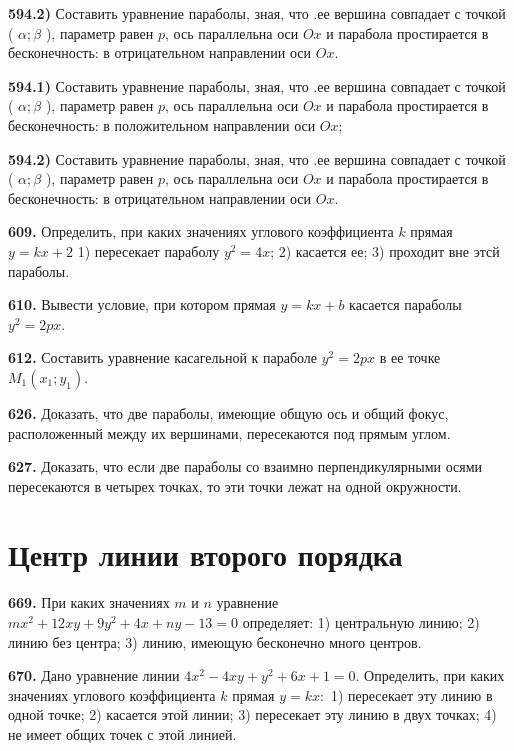 \textbf{594.2)} Составить уравнение параболы, зная, что .ее вершина совпадает с точкой ( $\alpha ; \beta$ ), параметр равен $p$, ось параллельна оси $O x$ и парабола простирается в бесконечность: в отрицательном направлении оси $O x$.

\textbf{594.1)} Составить уравнение параболы, зная, что .ее вершина совпадает с точкой ( $\alpha ; \beta$ ), параметр равен $p$, ось параллельна оси $O x$ и парабола простирается в бесконечность: в положительном направлении оси $O x$;

\textbf{594.2)} Составить уравнение параболы, зная, что .ее вершина совпадает с точкой ( $\alpha ; \beta$ ), параметр равен $p$, ось параллельна оси $O x$ и парабола простирается в бесконечность: в отрицательном направлении оси $O x$.

\textbf{609.} Определить, при каких значениях углового коэффициента $k$ прямая $y=k x+2$ 1) пересекает параболу $y^2=4 x$; 2) касается ее; 3) проходит вне этсй параболы.

\textbf{610.} Вывести условие, при котором прямая $y=k x+b$ касается параболы $y^2=2 p x$.

\textbf{612.} Составить уравнение касагельной к параболе $y^2=2 p x$ в ее точке $M_1\left(x_1 ; y_1\right)$.

\textbf{626.} Доказать, что две параболы, имеющие общую ось и общий фокус, расположенный между их вершинами, пересекаются под прямым углом.

\textbf{627.} Доказать, что если две параболы со взаимно перпендикулярными осями пересекаются в четырех точках, то эти точки лежат на одной окружности.



\section{ Центр линии второго порядка }



\textbf{669.} При каких значениях $m$ и $n$ уравнение $m x^2+12 x y+9 y^2+4 x+n y-13=0$ определяет: 1) центральную линию; 2) линию без центра; 3) линию, имеющую бесконечно много центров.

\textbf{670.} Дано уравнение линии $4 x^2-4 x y+y^2+6 x+1=0$. Определить, при каких значениях углового коэффициента $k$ прямая $y=k x:$ 1) пересекает эту линию в одной точке; 2) касается этой линии; 3) пересекает эту линию в двух точках; 4) не имеет общих точек с этой линией.



